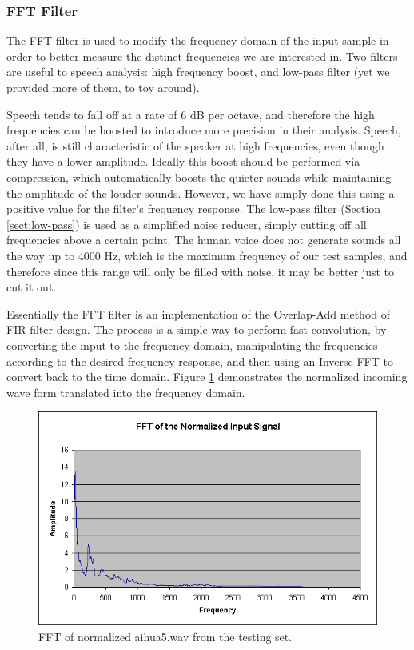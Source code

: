 \subsubsection{FFT Filter}\label{sect:fft-filter}

The FFT filter is used to modify the frequency domain of the input sample in
order to better measure the distinct frequencies we are interested in.
Two filters are useful to speech analysis: high frequency boost, and low-pass
filter (yet we provided more of them, to toy around).

Speech tends to fall off at a rate of 6 dB per octave, and therefore the high
frequencies can be boosted to introduce more precision in their analysis.
Speech, after all, is still characteristic of the speaker at high frequencies,
even though they have a lower amplitude.  Ideally this boost should be performed
via compression, which automatically boosts the quieter sounds while maintaining
the amplitude of the louder sounds.  However, we have simply done this using a
positive value for the filter's frequency response.
The low-pass filter (Section \ref{sect:low-pass}) is used as a simplified noise reducer, simply cutting off
all frequencies above a certain point.  The human voice does not generate sounds
all the way up to 4000 Hz, which is the maximum frequency of our test samples,
and therefore since this range will only be filled with noise, it may be better
just to cut it out.

Essentially the FFT filter is an implementation of the Overlap-Add method of FIR
filter design.  The process is a simple way to perform fast convolution, by
converting the input to the frequency domain, manipulating the frequencies
according to the desired frequency response, and then using an Inverse-FFT to
convert back to the time domain. Figure \ref{fig:fft-filter} demonstrates
the normalized incoming wave form translated into the frequency domain.

\begin{figure}
	\centering
	\includegraphics[width=400pt]{../graphics/graphs/fft.png}
	\caption{FFT of normalized aihua5.wav from the testing set.}
	\label{fig:fft-filter}
\end{figure}


